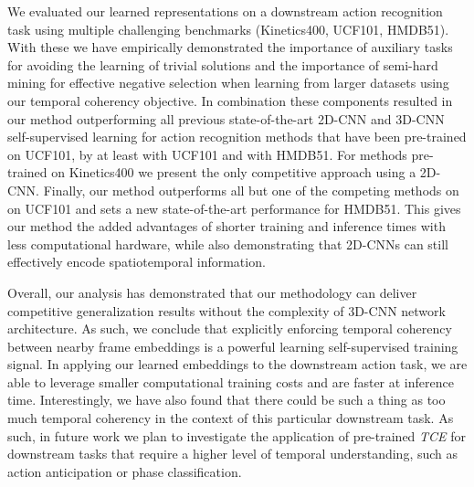 \documentclass[a4paper,conference]{IEEEtran}
\begin{document}
We evaluated our learned representations on a downstream action recognition task using multiple challenging benchmarks (Kinetics400, UCF101, HMDB51). With these we have empirically demonstrated the importance of auxiliary tasks for avoiding the learning of trivial solutions and the importance of semi-hard mining for effective negative selection when learning from larger datasets using our temporal coherency objective. In combination these components resulted in our method outperforming all previous state-of-the-art 2D-CNN and 3D-CNN self-supervised learning for action recognition methods that have been pre-trained on UCF101, by at least  with UCF101 and  with HMDB51. For methods pre-trained on Kinetics400 we present the only competitive approach using a 2D-CNN.  Finally, our method outperforms all but one of the competing methods on on UCF101 and sets a new state-of-the-art performance for HMDB51. This gives our method the added advantages of shorter training and inference times with less computational hardware, while also demonstrating that 2D-CNNs can still effectively encode spatiotemporal information.

Overall, our analysis has demonstrated that our methodology can deliver competitive generalization results without the complexity of 3D-CNN network architecture. As such, we conclude that explicitly enforcing temporal coherency between nearby frame embeddings is a powerful learning self-supervised training signal. In applying our learned embeddings to the downstream action task, we are able to leverage smaller computational training costs and are faster at inference time. Interestingly, we have also found that there could be such a thing as too much temporal coherency in the context of this particular downstream task. As such, in future work we plan to investigate the application of pre-trained \textit{TCE} for downstream tasks that require a higher level of temporal understanding, such as action anticipation or phase classification.


 


\balance



\end{document}
